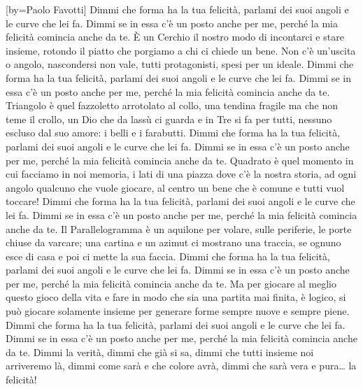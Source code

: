 [by={Paolo Favotti}]
\chordsoff
\ifchorded
\beginverse*
\vspace*{-0.8\versesep}
{\nolyrics }
\vspace*{-\versesep}
\endverse
\fi
\beginchorus
Dimmi che forma ha la tua felicità,
parlami dei suoi angoli e le curve che lei fa.
Dimmi se in essa c'è un posto anche per me,
perché la mia felicità comincia anche da te.
\endchorus
\beginverse \memorize
È un Cerchio il nostro modo di incontarci e stare insieme,
rotondo il piatto che porgiamo a chi ci chiede un bene.
Non c'è un'uscita o angolo, nascondersi non vale, 
tutti protagonisti, spesi per un ideale.
\endverse
\beginchorus
Dimmi che forma ha la tua felicità,
parlami dei suoi angoli e le curve che lei fa.
Dimmi se in essa c'è un posto anche per me,
perché la mia felicità comincia anche da te.
\endchorus
\beginverse
Triangolo è quel fazzoletto arrotolato al collo, 
una tendina fragile ma che non teme il crollo,
un Dio che da lassù ci guarda e in Tre si fa per tutti,
nessuno escluso dal suo amore: i belli e i farabutti.
\endverse
\beginchorus
Dimmi che forma ha la tua felicità,
parlami dei suoi angoli e le curve che lei fa.
Dimmi se in essa c'è un posto anche per me,
perché la mia felicità comincia anche da te.
\endchorus
\beginverse
Quadrato è quel momento in cui facciamo in noi memoria,
i lati di una piazza dove c'è la nostra storia,
ad ogni angolo qualcuno che vuole giocare,
al centro un bene che è comune e tutti vuol toccare!
\endverse
\beginchorus
Dimmi che forma ha la tua felicità,
parlami dei suoi angoli e le curve che lei fa.
Dimmi se in essa c'è un posto anche per me,
perché la mia felicità comincia anche da te.
\endchorus
\beginverse
Il Parallelogramma è un aquilone per volare,
sulle periferie, le porte chiuse da varcare;
una cartina e un azimut ci mostrano una traccia,
se ognuno esce di casa e poi ci mette la sua faccia.
\endverse
\beginchorus
Dimmi che forma ha la tua felicità,
parlami dei suoi angoli e le curve che lei fa.
Dimmi se in essa c'è un posto anche per me,
perché la mia felicità comincia anche da te.
\endchorus
\beginverse
Ma per giocare al meglio questo gioco della vita
e fare in modo che sia una partita mai finita,
è logico, si può giocare solamente insieme
per generare forme sempre nuove e sempre piene.
\endverse
\beginchorus
Dimmi che forma ha la tua felicità,
parlami dei suoi angoli e le curve che lei fa.
Dimmi se in essa c'è un posto anche per me,
perché la mia felicità comincia anche da te.
\endchorus
\beginchorus
Dimmi la verità, dimmi che già si sa,
dimmi che tutti insieme noi arriveremo là,
dimmi come sarà e che colore avrà,
dimmi che sarà vera e pura\dots{} la felicità!
\endchorus
\endsong
